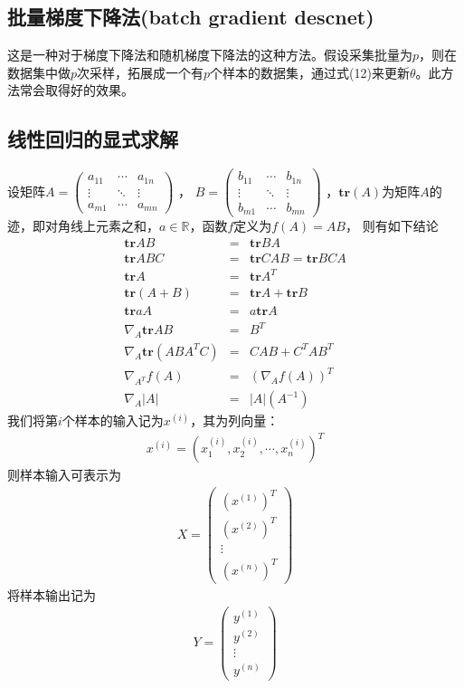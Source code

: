 \subsection{批量梯度下降法(batch gradient descnet)}
这是一种对于梯度下降法和随机梯度下降法的这种方法。假设采集批量为$p$，则在数据集中做$p$次采样，拓展成一个有$p$个样本的数据集，通过式(12)来更新$\theta$。此方法常会取得好的效果。
\subsection{线性回归的显式求解}
设矩阵$A=
\begin{pmatrix}
a_{11} & \cdots & a_{1n}\\
\vdots & \ddots & \vdots\\
a_{m1} & \cdots & a_{mn}
\end{pmatrix}
$
，
$B=
\begin{pmatrix}
b_{11} & \cdots & b_{1n}\\
\vdots & \ddots & \vdots\\
b_{m1} & \cdots & b_{mn}
\end{pmatrix}
$
，$\textbf{tr}(A)$为矩阵$A$的迹，即对角线上元素之和，$a\in \mathbb{R}$，函数$f$定义为$f(A)=AB$，
则有如下结论
\begin{eqnarray}
\textbf{tr}AB&=&\textbf{tr}BA\\
\textbf{tr}ABC&=&\textbf{tr}CAB = \textbf{tr}BCA\\
\textbf{tr}A&=&\textbf{tr}A^T\\
\textbf{tr}(A+B)&=&\textbf{tr}A+\textbf{tr}B\\
\textbf{tr}aA&=&a\textbf{tr}A\\
\nabla_{A}\textbf{tr}AB &=& B^T\\
\nabla_A \textbf{tr}(ABA^TC) &=& CAB+C^TAB^T\\
\nabla_{A^T}f(A)&=&(\nabla_Af(A))^T\\
\nabla_A|A|&=&|A|(A^{-1})
\end{eqnarray}
我们将第$i$个样本的输入记为$x^{(i)}$，其为列向量：
\begin{eqnarray}
x^{(i)}=(x^{(i)}_1,x^{(i)}_2,\cdots,x^{(i)}_n)^T
\end{eqnarray}
则样本输入可表示为
\begin{eqnarray}
X=
\begin{pmatrix}
(x^{(1)})^T\\
(x^{(2)})^T\\
\vdots\\
(x^{(n)})^T
\end{pmatrix}
\end{eqnarray}
将样本输出记为
\begin{eqnarray}
Y=
\begin{pmatrix}
y^{(1)}\\
y^{(2)}\\
\vdots\\
y^{(n)}
\end{pmatrix}
\end{eqnarray}

